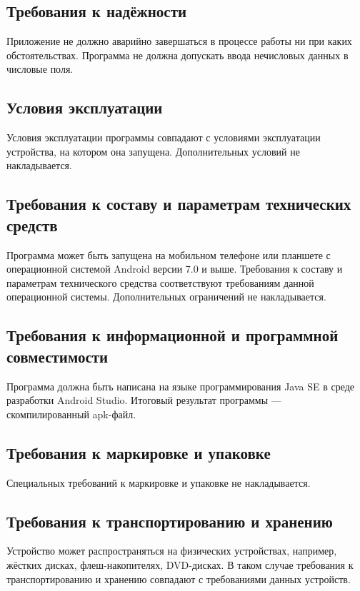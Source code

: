 \documentclass[draft]{article}
\begin{document}
\subsection{Требования к надёжности}
Приложение не должно аварийно завершаться в процессе работы ни при каких обстоятельствах. Программа не должна допускать ввода нечисловых данных в числовые поля.
\subsection{Условия эксплуатации}
Условия эксплуатации программы совпадают с условиями эксплуатации устройства, на котором она запущена. Дополнительных условий не накладывается.
\subsection{Требования к составу и параметрам технических средств}
Программа может быть запущена на мобильном телефоне или планшете с операционной системой Android версии 7.0 и выше. Требования к составу и параметрам технического средства соответствуют требованиям данной операционной системы. Дополнительных ограничений не накладывается.
\subsection{Требования к информационной и программной совместимости}
Программа должна быть написана на языке программирования Java SE в среде разработки Android Studio. Итоговый результат программы — скомпилированный apk-файл.
\subsection{Требования к маркировке и упаковке}
Специальных требований к маркировке и упаковке не накладывается.
\subsection{Требования к транспортированию и хранению}
Устройство может распространяться на физических устройствах, например, жёстких дисках, флеш-накопителях, DVD-дисках. В таком случае требования к транспортированию и хранению совпадают с требованиями данных устройств.
\end{document}

